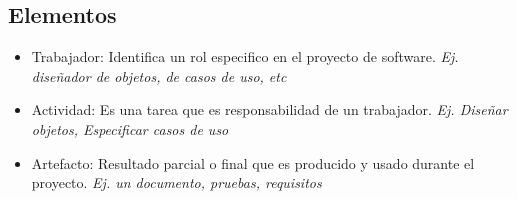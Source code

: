 \documentclass[titlepage,a4paper]{article}
\begin{document}
\subsection*{Elementos}

\begin{itemize}
    \item Trabajador: Identifica un rol especifico en el proyecto de software. \textit{Ej. diseñador de objetos, de casos de uso, etc}
    \item Actividad: Es una tarea que es responsabilidad de un trabajador. \textit{Ej. Diseñar objetos, Especificar casos de uso}
    \item Artefacto: Resultado parcial o final que es producido y usado durante el proyecto. \textit{Ej. un documento, pruebas, requisitos}
\end{itemize}

\newpage
\end{document}
